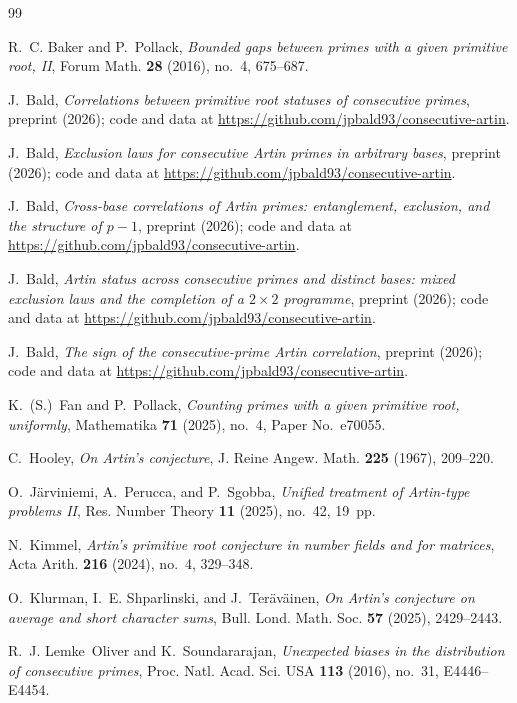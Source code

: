 \documentclass[11pt,reqno]{amsart}
\theoremstyle{plain}
\theoremstyle{definition}
\begin{document}
\begin{thebibliography}{99}

R.~C. Baker and P.~Pollack,
\emph{Bounded gaps between primes with a given primitive root, II},
Forum Math. \textbf{28} (2016), no.~4, 675--687.

J.~Bald,
\emph{Correlations between primitive root statuses of consecutive primes},
preprint (2026); code and data at
\url{https://github.com/jpbald93/consecutive-artin}.

J.~Bald,
\emph{Exclusion laws for consecutive Artin primes in arbitrary bases},
preprint (2026); code and data at
\url{https://github.com/jpbald93/consecutive-artin}.

J.~Bald,
\emph{Cross-base correlations of Artin primes: entanglement, exclusion, and
the structure of $p-1$},
preprint (2026); code and data at
\url{https://github.com/jpbald93/consecutive-artin}.

J.~Bald,
\emph{Artin status across consecutive primes and distinct bases: mixed
exclusion laws and the completion of a $2 \times 2$ programme},
preprint (2026); code and data at
\url{https://github.com/jpbald93/consecutive-artin}.

J.~Bald,
\emph{The sign of the consecutive-prime Artin correlation},
preprint (2026); code and data at
\url{https://github.com/jpbald93/consecutive-artin}.

K.~(S.)~Fan and P.~Pollack,
\emph{Counting primes with a given primitive root, uniformly},
Mathematika \textbf{71} (2025), no.~4, Paper No.~e70055.

C.~Hooley,
\emph{On Artin's conjecture},
J. Reine Angew. Math. \textbf{225} (1967), 209--220.

O.~J\"arviniemi, A.~Perucca, and P.~Sgobba,
\emph{Unified treatment of Artin-type problems II},
Res. Number Theory \textbf{11} (2025), no.~42, 19~pp.

N.~Kimmel,
\emph{Artin's primitive root conjecture in number fields and for matrices},
Acta Arith. \textbf{216} (2024), no.~4, 329--348.

O.~Klurman, I.~E. Shparlinski, and J.~Ter\"av\"ainen,
\emph{On Artin's conjecture on average and short character sums},
Bull. Lond. Math. Soc. \textbf{57} (2025), 2429--2443.

R.~J. Lemke~Oliver and K.~Soundararajan,
\emph{Unexpected biases in the distribution of consecutive primes},
Proc. Natl. Acad. Sci. USA \textbf{113} (2016), no.~31, E4446--E4454.


\end{thebibliography}
\end{document}
